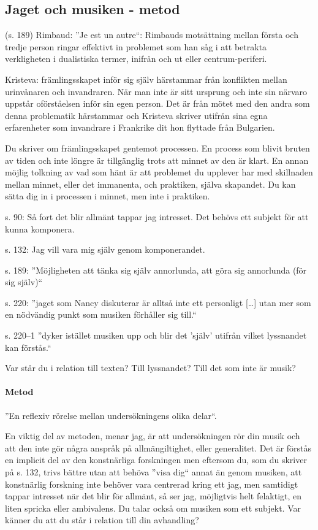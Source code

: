\documentclass{article}
\begin{document}
\subsection{Jaget och musiken - metod}

(s. 189) Rimbaud: ''Je est un autre``: Rimbauds motsättning mellan första och tredje person ringar effektivt in problemet som han såg i att betrakta verkligheten i dualistiska termer, inifrån och ut eller centrum-periferi.

Kristeva: främlingsskapet inför sig själv härstammar från konflikten mellan urinvånaren och invandraren. När man inte är sitt ursprung och inte sin närvaro uppstår oförståelsen inför sin egen person. Det är från mötet med den andra som denna problematik härstammar och Kristeva skriver utifrån sina egna erfarenheter som invandrare i Frankrike dit hon flyttade från Bulgarien.

Du skriver om främlingsskapet gentemot processen. En process som blivit bruten av tiden och inte löngre är tillgänglig trots att minnet av den är klart. En annan möjlig tolkning av vad som hänt är att problemet du upplever har med skillnaden mellan minnet, eller det immanenta, och praktiken, själva skapandet. Du kan sätta dig in i processen i minnet, men inte i praktiken.

s. 90: Så fort det blir allmänt tappar jag intresset. Det behövs ett subjekt för att kunna komponera.

s. 132: Jag vill vara mig själv genom komponerandet.

s. 189: ''Möjligheten att tänka sig själv annorlunda, att göra sig annorlunda (för sig själv)``

s. 220: ''jaget som Nancy diskuterar är alltså inte ett personligt [\dots{}] utan mer som en nödvändig punkt som musiken förhåller sig till.``

s. 220--1 ''dyker istället musiken upp och blir det 'själv' utifrån vilket lyssnandet kan förstås.``

Var står du i relation till texten? Till lyssnandet? Till det som inte är musik?

\paragraph{Metod}

''En reflexiv rörelse mellan undersökningens olika delar``.

En viktig del av metoden, menar jag, är att undersökningen rör din musik och att den inte gör några anspråk på allmängiltighet, eller generalitet. Det är förstås en implicit del av den konstnärliga forskningen men eftersom du, som du skriver på s. 132, trivs bättre utan att behöva ''visa dig`` annat än genom musiken, att konstnärlig forskning inte behöver vara centrerad kring ett jag, men samtidigt tappar intresset när det blir för allmänt, så ser jag, möjligtvis helt felaktigt, en liten spricka eller ambivalens. Du talar också om musiken som ett subjekt. Var känner du att du står i relation till din avhandling?
\end{document}
